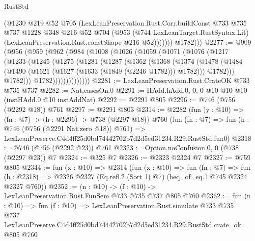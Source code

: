 \begin{lexlean}{RustStd}
\begin{coremodule}
                (@1230
                  @219
                  @52
                  @705
                  (LexLeanPreservation.Rust.Corr.buildConst
                    @733
                    @735
                    @737
                    @1228
                    @348
                    @216
                    @52
                    @704
                    (@953
                      (@744 LexLeanTarget.RustSyntax.Lit)
                      (LexLeanPreservation.Rust.constShape @216 @52)))))))
          @1782)))
@2277 := @909
    (@956
      (@959
        (@962
          (@984
            (@1008
              (@1026
                (@1059
                  (@1071
                    (@1076
                      (@1217
                        (@1233
                          (@1245
                            (@1275
                              (@1281
                                (@1287
                                  (@1362
                                    (@1368
                                      (@1374
                                        (@1478
                                          (@1484
                                            (@1490
                                              (@1621 (@1627 (@1633 (@1849 (@2246 @1782))) @1782)))
                                            @1782)))
                                      @1782)))
                                @1782))))))))))))))
@2281 := LexLeanPreservation.Rust.CrateOK @733 @735 @737
@2282 := Nat.casesOn.{0}
@2291 := HAdd.hAdd.{0, 0, 0} @10 @10 @10 (instHAdd.{0} @10 instAddNat)
@2292 := @2291 @805
@2296 := @746 (@756 (@2292 @18)) @761
@2297 := @2291 @803
@2314 := @2282
    (fun (y : @10) => (fn : @7) -> (h : @2296) -> @738 (@2297 @18))
    @760
    (fun (fn : @7) =>
    fun (h : @746 (@756 (@2291 Nat.zero @18)) @761) =>
    LexLeanPreserve.C4d4ff25d0bd74442702b7d2d5ed31234.R29.RustStd.fun0)
@2318 := @746 (@756 (@2292 @23)) @761
@2323 := Option.noConfusion.{0, 0} (@738 (@2297 @23)) @7
@2324 := @325 @7
@2326 := @2323 @2324 @7
@2327 := @759 @805
@2344 := fun (x : @10) =>
  @2314
    (fun (x : @10) =>
    fun (fn : @7) =>
    fun (h : @2318) => @2326 @2327 (Eq.refl.{2} (Sort 1) @7) (heq_of_eq.{1} @745 @2324 @2327 @760))
@2352 := (n : @10) -> (f : @10) -> LexLeanPreservation.Rust.FunSem @733 @735 @737 @805 @760
@2362 := fun (n : @10) =>
  fun (f : @10) =>
  LexLeanPreservation.Rust.simulate
    @733
    @735
    @737
    LexLeanPreserve.C4d4ff25d0bd74442702b7d2d5ed31234.R29.RustStd.crate_ok
    @805
    @760
\end{coremodule}
\end{lexlean}
